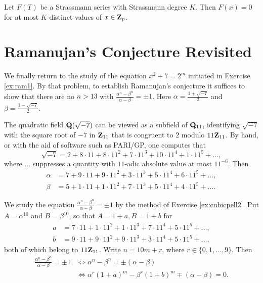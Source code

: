 \begin{prob}\label{ex:strassthm} Let $F(T)$ be a Strassmann series with Strassmann degree $K$. Then $F(x)=0$ for at most $K$ distinct values of $x \in \mathbf{Z}_p$.
\end{prob}

\section*{Ramanujan's Conjecture Revisited}
We finally return to the study of the equation $x^2+7= 2^m$ initiated in Exercise \ref{ex:ram1}. By that problem, to establish Ramanujan's conjecture it suffices to show that there are no $n>13$ with $\frac{\alpha^n-\beta^n}{\alpha-\beta} = \pm 1$. Here $\alpha = \frac{1+\sqrt{-7}}{2}$ and $\beta =\frac{1-\sqrt{-7}}{2}$.

The quadratic field $\mathbf{Q}(\sqrt{-7})$ can be viewed as a subfield of $\mathbf{Q}_{11}$, identifying $\sqrt{-7}$ with the square root of $-7$ in $\mathbf{Z}_{11}$ that is congruent to $2$ modulo $11\mathbf{Z}_{11}$. By hand, or with the aid of software such as PARI/GP, one computes that  \[ \sqrt{-7} = 2 + 8\cdot 11 + 8 \cdot 11^2 + 7 \cdot 11^3 + 10\cdot 11^4 + 1\cdot 11^5 + \dots,  \]
where $\dots$ suppresses a quantity with $11$-adic absolute value at most $11^{-6}$. Then
\begin{align*} \alpha &= 7 + 9\cdot 11 + 9\cdot 11^2 + 3\cdot 11^3 + 5\cdot 11^4 + 6\cdot 11^5 + \dots,\\
\beta &= 5 + 1\cdot 11 + 1\cdot 11^2 + 7\cdot 11^3 + 5\cdot 11^4 + 4\cdot 11^5 + \dots.\end{align*}

We study the equation $\frac{\alpha^n  - \beta^n}{\alpha-\beta}= \pm 1$ by the method of Exercise \ref{ex:cubicpell2}. Put $A=\alpha^{10}$ and $B = \beta^{10}$, so that $A= 1+a, B=1+b$ for 
\begin{align*}
 a&= 7\cdot 11 + 1\cdot 11^2 + 1\cdot 11^3 + 7\cdot 11^4 + 5\cdot 11^5 + \dots,\\
 b&= 9\cdot 11 + 9\cdot 11^2 + 9\cdot 11^3 + 3\cdot 11^4 + 5\cdot 11^5 +\dots,
\end{align*}
both of which belong to $11\mathbf{Z}_{11}$. Write $n = 10m+r$, where $r \in \{0,1,\dots,9\}$. Then 
\begin{align*} \frac{\alpha^n - \beta^n}{\alpha-\beta} = \pm 1 &\Longleftrightarrow \alpha^n-\beta^n = \pm (\alpha-\beta) \\
&\Longleftrightarrow \alpha^{r} (1+a)^m - \beta^{r} (1+b)^m \mp (\alpha-\beta) = 0.
\end{align*}

